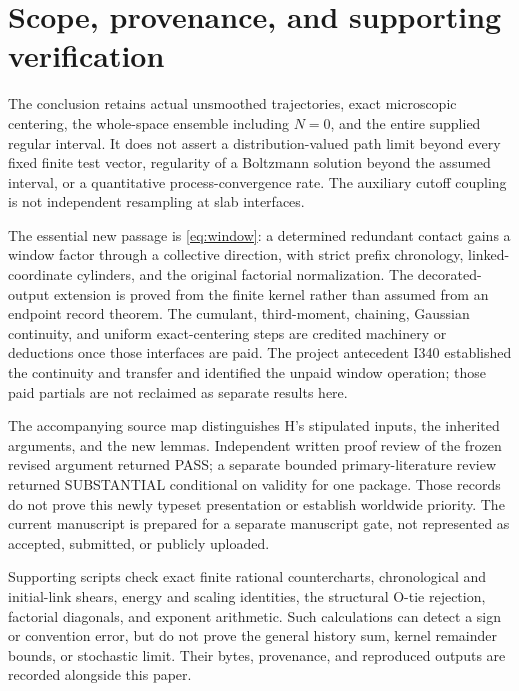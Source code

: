 \documentclass[11pt]{article}
\theoremstyle{definition}\newtheorem{definition}[theorem]{Definition}
\theoremstyle{remark}\newtheorem{remark}[theorem]{Remark}
\numberwithin{equation}{section}
\begin{document}
\section{Scope, provenance, and supporting verification}\label{sec:scope}
The conclusion retains actual unsmoothed trajectories, exact microscopic
centering, the whole-space ensemble including $N=0$, and the entire
supplied regular interval. It does not assert a distribution-valued path
limit beyond every fixed finite test vector, regularity of a Boltzmann
solution beyond the assumed interval, or a quantitative process-convergence
rate. The auxiliary cutoff coupling is not independent resampling at slab
interfaces.

The essential new passage is \eqref{eq:window}: a determined redundant
contact gains a window factor through a collective direction, with strict
prefix chronology, linked-coordinate cylinders, and the original factorial
normalization. The decorated-output extension is proved from the finite
kernel rather than assumed from an endpoint record theorem. The cumulant,
third-moment, chaining, Gaussian continuity, and uniform exact-centering
steps are credited machinery or deductions once those interfaces are paid.
The project antecedent I340 established the continuity and transfer and
identified the unpaid window operation; those paid partials are not
reclaimed as separate results here.

The accompanying source map distinguishes H's stipulated inputs, the
inherited arguments, and the new lemmas. Independent written proof review
of the frozen revised argument returned PASS; a separate bounded
primary-literature review returned SUBSTANTIAL conditional on validity for
one package. Those records do not prove this newly typeset presentation or
establish worldwide priority. The current manuscript is prepared for a
separate manuscript gate, not represented as accepted, submitted, or
publicly uploaded.

Supporting scripts check exact finite rational countercharts, chronological
and initial-link shears, energy and scaling identities, the structural O-tie
rejection, factorial diagonals, and exponent arithmetic. Such calculations
can detect a sign or convention error, but do not prove the general history
sum, kernel remainder bounds, or stochastic limit. Their bytes, provenance,
and reproduced outputs are recorded alongside this paper.
\end{document}
